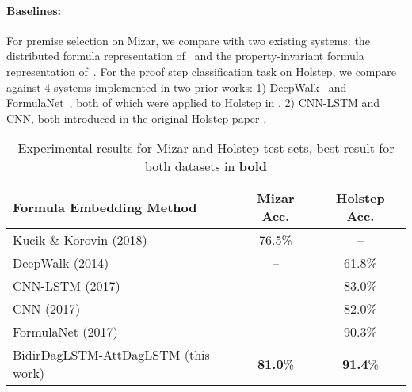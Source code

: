 \documentclass{article}
\begin{document}
\paragraph{Baselines:} For premise selection on Mizar, we compare with two existing systems: the distributed formula representation of~\cite{kucik2018premise} and the property-invariant formula representation of~\cite{olvsak2019property}. For the proof step classification task on Holstep, we compare against 4 systems implemented in two prior works: 1) DeepWalk~\cite{perozzi2014deepwalk} and FormulaNet~\cite{wang2017premise}, both of which were applied to Holstep in \cite{wang2017premise}. 2) CNN-LSTM and CNN, both introduced in the original Holstep paper \cite{kaliszyk2017holstep}.








\begin{table}[t]
\centering
\caption{Experimental results for Mizar and Holstep test sets, best result for both datasets in \textbf{bold}}
\vskip 0.1in
\label{res:exp_all}
\footnotesize
\setlength\tabcolsep{4pt}\begin{tabular}{ l !{\vrule} c c }
\toprule 
\textbf{Formula Embedding Method} & \textbf{Mizar Acc.} & \textbf{Holstep Acc.}  \\
\midrule
Kucik \& Korovin (2018)~\cite{kucik2018premise} & 76.5\%  &  \\
DeepWalk (2014)~\cite{perozzi2014deepwalk} &  & 61.8\%   \\
CNN-LSTM (2017)~\cite{kaliszyk2017holstep} &  & 83.0\%   \\
CNN (2017)~\cite{kaliszyk2017holstep}      &  & 82.0\%  \\
FormulaNet (2017)~\cite{wang2017premise} &  &  90.3\% \\
BidirDagLSTM-AttDagLSTM (this work) & \textbf{81.0}\% & \textbf{91.4}\%\\
\bottomrule
\end{tabular}
\vspace{-0.1in}
\end{table}
\end{document}
